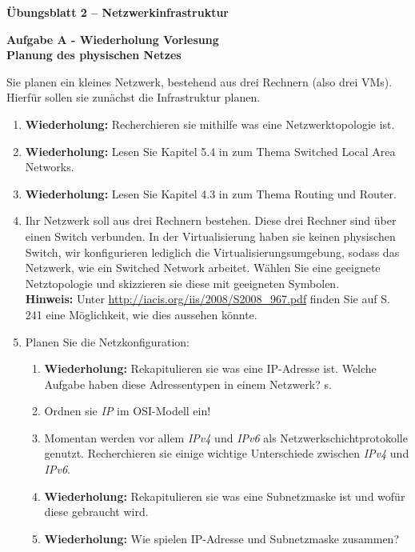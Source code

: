 \documentclass[paper=a4,fontsize=11pt]{scrartcl}%
\numberwithin{equation}{section}
\begin{document}
\begin{center}
\Large{\textbf{Übungsblatt 2 -- Netzwerkinfrastruktur}}
\end{center}

\begin{center}\Large{\textbf{Aufgabe A - Wiederholung Vorlesung\\Planung des physischen Netzes}}\end{center}

Sie planen ein kleines Netzwerk, bestehend aus drei Rechnern (also drei VMs). Hierfür sollen sie zunächst die Infrastruktur planen.
\begin{enumerate}
	\item \textbf{Wiederholung:} Recherchieren sie mithilfe \cite[S. 461ff]{Kurose2012}  was eine Netzwerktopologie ist.
	\item  \textbf{Wiederholung:} Lesen Sie Kapitel 5.4 in \cite[S. 461]{Kurose2012} zum Thema Switched Local Area Networks.
	\item \textbf{Wiederholung:} Lesen Sie Kapitel 4.3 in \cite[S. 320ff]{Kurose2012} zum Thema Routing und Router.
	\item Ihr Netzwerk soll aus drei Rechnern bestehen. Diese drei Rechner sind über einen Switch verbunden. In der Virtualisierung haben sie keinen physischen Switch, wir konfigurieren lediglich die Virtualisierungsumgebung, sodass das Netzwerk, wie ein Switched Network arbeitet.
	Wählen Sie eine geeignete Netztopologie und skizzieren sie diese mit geeigneten Symbolen.\\ 
	\textbf{Hinweis:} Unter \url{http://iacis.org/iis/2008/S2008_967.pdf} finden Sie auf S. 241 eine Möglichkeit, wie dies aussehen könnte.\\
	\item Planen Sie die Netzkonfiguration:
	\begin{enumerate}
		\item  \textbf{Wiederholung:} Rekapitulieren sie was eine IP-Adresse ist. Welche Aufgabe haben diese Adressentypen in einem Netzwerk? s. \cite[S. 331ff]{Kurose2012}
		\item Ordnen sie \emph{IP} im OSI-Modell ein!
		\item Momentan werden vor allem \emph{IPv4} und \emph{IPv6} als Netzwerkschichtprotokolle genutzt. Recherchieren sie einige wichtige Unterschiede zwischen \emph{IPv4} und \emph{IPv6}.
		\item  \textbf{Wiederholung:} Rekapitulieren sie was eine Subnetzmaske ist und wofür diese gebraucht wird.
		\item \textbf{Wiederholung:} Wie spielen IP-Adresse und Subnetzmaske zusammen?

\end{enumerate}
\end{enumerate}
\end{document}
